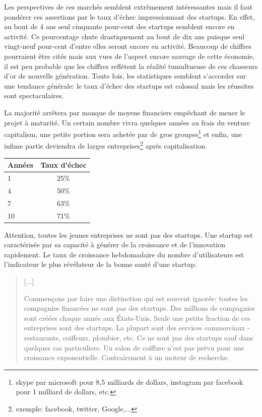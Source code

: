 \documentclass[11pt, a4paper ]{article}
\begin{document}
\begin{spacing}{1.5}
Les perspectives de ces marchés semblent extrêmement intéressantes mais il faut pondérer ces assertions par le taux d'échec impressionnant des startups. En effet, au bout de 4 ans seul cinquante pour-cent des startups semblent encore en activité. Ce pourcentage chute drastiquement au bout de dix ans puisque seul vingt-neuf pour-cent d'entre elles seront encore en activité.
Beaucoup de chiffres pourraient être cités mais aux vues de l'aspect encore sauvage de cette économie, il est peu probable que les chiffres reflètent la réalité tumultueuse de ces chasseurs d'or de nouvelle génération.
Toute fois, les statistiques semblent s'accorder sur une tendance générale: le taux d'échec des startups est colossal mais les réussites sont spectaculaires.

La majorité arrêtera par manque de moyens financiers empêchant de mener le projet à maturité. Un certain nombre vivra quelques années au frais du venture capitalism, une petite portion sera achetée par de gros groupes\footnote{skype par microsoft pour 8,5 milliards de dollars, instagram par facebook pour 1 milliard de dollars, etc.} et enfin, une infime partie deviendra de larges entreprises\footnote{exemple: facebook, twitter, Google,...} après capitalisation.

\begin{center}
	\begin{tabular}{l*{1}{c}}
		Années  & Taux d'échec\\
		\hline
		1 & 25\% \\
		4 & 50\% \\
		7 & 63\% \\
		10 & 71\% \\
	\end{tabular}\cite{statEchecStartup}
\end{center}

Attention, toutes les jeunes entreprises ne sont pas des startups. Une startup est caractérisée par sa capacité à générer de la croissance et de l'innovation rapidement. Le taux de croissance hebdomadaire du nombre d'utilisateurs est l'indicateur le plus révélateur de la bonne santé d'une startup.

\begin{quote}
	[...]

	Commençons par faire une distinction qui est souvent ignorée: toutes les compagnies financées ne sont pas des startups. Des millions de compagnies sont créées chaque année aux États-Unis. Seule une petite fraction de ces entreprises sont des startups. La plupart sont des services commerciaux - restaurants, coiffeurs, plombier, etc. Ce ne sont pas des startups sauf dans quelques cas particuliers. Un salon de coiffure n'est pas prévu pour une croissance exponentielle. Contrairement à un moteur de recherche.


\end{quote}
\end{spacing}
\end{document}
